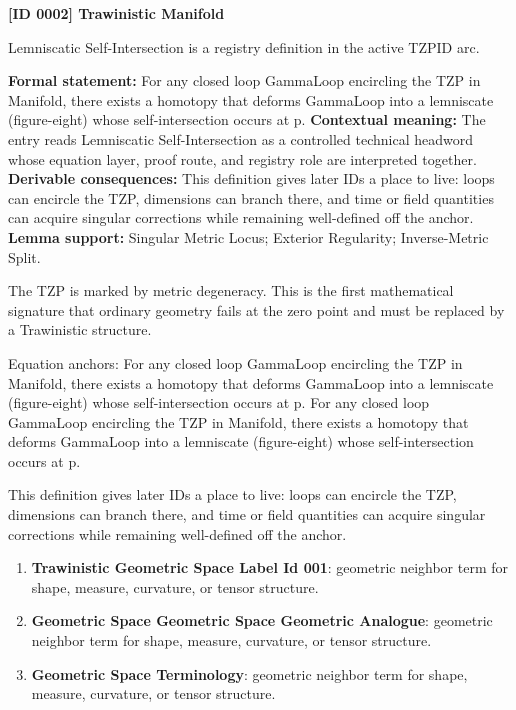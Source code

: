 \clearpage
\noindent\textbf{[ID 0002] Trawinistic Manifold}\par
\vspace{0.35em}
\begingroup\small
{}
Lemniscatic Self-Intersection is a registry definition in the active TZPID arc.

\begingroup\footnotesize\setlength{\emergencystretch}{3em}\sloppy
\textbf{Formal statement:} For any closed loop GammaLoop encircling the TZP in Manifold, there exists a homotopy that deforms GammaLoop into a lemniscate (figure-eight) whose self-intersection occurs at p. \textbf{Contextual meaning:} The entry reads Lemniscatic Self-Intersection as a controlled technical headword whose equation layer, proof route, and registry role are interpreted together. \textbf{Derivable consequences:} This definition gives later IDs a place to live: loops can encircle the TZP, dimensions can branch there, and time or field quantities can acquire singular corrections while remaining well-defined off the anchor. \textbf{Lemma support:} Singular Metric Locus; Exterior Regularity; Inverse-Metric Split.\par
\endgroup

The TZP is marked by metric degeneracy. This is the first mathematical signature that ordinary geometry fails at the zero point and must be replaced by a Trawinistic structure.

Equation anchors: For any closed loop GammaLoop encircling the TZP in Manifold, there exists a homotopy that deforms GammaLoop into a lemniscate (figure-eight) whose self-intersection occurs at p. For any closed loop GammaLoop encircling the TZP in Manifold, there exists a homotopy that deforms GammaLoop into a lemniscate (figure-eight) whose self-intersection occurs at p.

This definition gives later IDs a place to live: loops can encircle the TZP, dimensions can branch there, and time or field quantities can acquire singular corrections while remaining well-defined off the anchor.
\endgroup

\begingroup\footnotesize\sloppy
\begin{enumerate}[leftmargin=1.35em,itemsep=1pt,topsep=1pt,parsep=0pt]
\item \textbf{Trawinistic Geometric Space Label Id 001}: geometric neighbor term for shape, measure, curvature, or tensor structure.
\item \textbf{Geometric Space Geometric Space Geometric Analogue}: geometric neighbor term for shape, measure, curvature, or tensor structure.
\item \textbf{Geometric Space Terminology}: geometric neighbor term for shape, measure, curvature, or tensor structure.
\end{enumerate}
\endgroup

